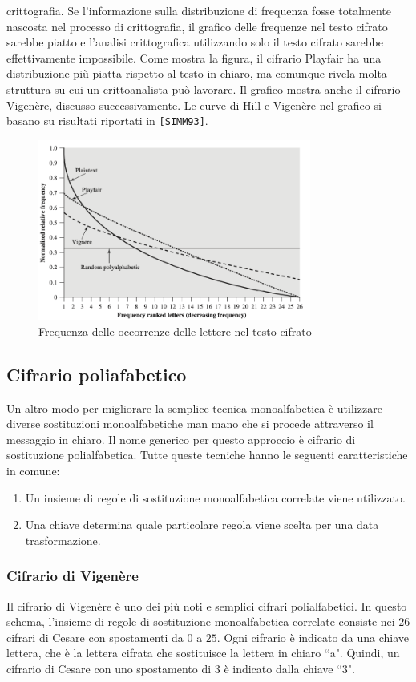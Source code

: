 crittografia. Se l'informazione sulla distribuzione di frequenza fosse totalmente nascosta nel processo
di crittografia, il grafico delle frequenze nel testo cifrato sarebbe piatto e l'analisi crittografica
utilizzando solo il testo cifrato sarebbe effettivamente impossibile. Come mostra la figura, il cifrario
Playfair ha una distribuzione più piatta rispetto al testo in chiaro, ma comunque rivela molta struttura
su cui un crittoanalista può lavorare. Il grafico mostra anche il cifrario Vigenère, discusso
successivamente. Le curve di Hill e Vigenère nel grafico si basano su risultati riportati in \verb|[SIMM93]|.
\begin{figure}[H]
    \centering
    \includegraphics[width=0.8\textwidth]{img/frequenza_playfair.png}
    \caption{Frequenza delle occorrenze delle lettere nel testo cifrato}
    \label{fig:playfair}
\end{figure}
\subsection{Cifrario poliafabetico}
Un altro modo per migliorare la semplice tecnica monoalfabetica è utilizzare
diverse sostituzioni monoalfabetiche man mano che si procede attraverso il
messaggio in chiaro. Il nome generico per questo approccio è cifrario di sostituzione
polialfabetica. Tutte queste tecniche hanno le seguenti caratteristiche in comune:

\begin{enumerate}
  \item Un insieme di regole di sostituzione monoalfabetica correlate viene utilizzato.
  \item Una chiave determina quale particolare regola viene scelta per una data trasformazione.
\end{enumerate}

\subsubsection{Cifrario di Vigenère}
Il cifrario di Vigenère è uno dei più noti e semplici cifrari polialfabetici.
In questo schema, l'insieme di regole di sostituzione monoalfabetica correlate consiste
nei $26$ cifrari di Cesare con spostamenti da $0$ a $25$. Ogni cifrario è indicato da una chiave
lettera, che è la lettera cifrata che sostituisce la lettera in chiaro ``a". Quindi, un
cifrario di Cesare con uno spostamento di 3 è indicato dalla chiave ``3".

